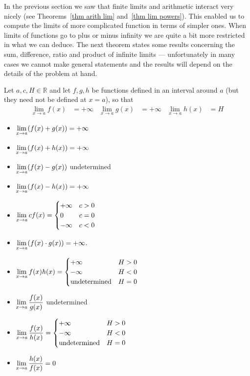 In the previous section we saw that finite limits and arithmetic interact very nicely
(see Theorems~\ref{thm arith lim} and~\ref{thm lim powers}). This enabled us to compute
the limits of more complicated function in terms of simpler ones. When limits of
functions go to plus or minus infinity we are quite a bit more restricted in what we can
deduce. The next theorem states some results concerning the sum, difference, ratio and
product of infinite limits --- unfortunately in many cases we cannot make general
statements and the results will depend on the details of the problem at hand.

\begin{theorem}
\label{thm arith inf lim}
 Let $a,c,H \in \mathbb{R}$ and let $f,g,h$ be functions defined in
an interval around $a$ (but they need not be defined at $x=a$), so that
\begin{align*}
  \lim_{x \to a} f(x) &= +\infty &
  \lim_{x \to a} g(x) &= +\infty &
  \lim_{x \to a} h(x) &= H
\end{align*}
\begin{itemize}
 \item $\displaystyle \lim_{x \to a} ( f(x) + g(x) ) = +\infty$
 \item $\displaystyle \lim_{x \to a} ( f(x) + h(x) ) = +\infty$
 \item $\displaystyle \lim_{x \to a} ( f(x) - g(x) )$ undetermined
 \item $\displaystyle \lim_{x \to a} ( f(x) - h(x) ) = +\infty$
 \item $\displaystyle \lim_{x \to a} c f(x) =
\begin{cases}
 +\infty & c>0 \\
0 & c=0 \\
-\infty & c<0
\end{cases}
$
\item $\displaystyle \lim_{x \to a} ( f(x) \cdot g(x) ) = +\infty$.
\item $\displaystyle \lim_{x \to a} f(x) h(x) =
\begin{cases}
 +\infty & H>0 \\
-\infty & H<0\\
\text{undetermined} & H=0
\end{cases}
$
\item $\displaystyle \lim_{x \to a} \frac{f(x)}{g(x)}$ undetermined

\item $\displaystyle \lim_{x \to a} \frac{f(x)}{h(x)} =
\begin{cases}
+\infty & H>0 \\
-\infty & H<0\\
\text{undetermined} & H=0
\end{cases}$
\item $\displaystyle \lim_{x \to a} \frac{h(x)}{f(x)} = 0$
\end{itemize}
\end{theorem}
